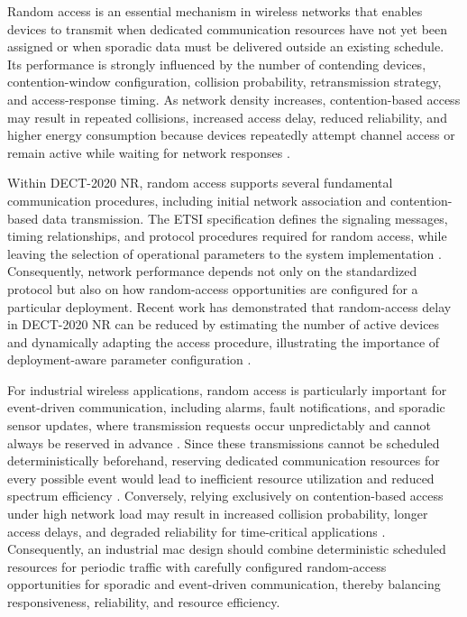 \documentclass[12pt,a4paper]{article}
\begin{document}
Random access is an essential mechanism in wireless networks that enables devices to transmit when dedicated communication resources have not yet been assigned or when sporadic data must be delivered outside an existing schedule. Its performance is strongly influenced by the number of contending devices, contention-window configuration, collision probability, retransmission strategy, and access-response timing. As network density increases, contention-based access may result in repeated collisions, increased access delay, reduced reliability, and higher energy consumption because devices repeatedly attempt channel access or remain active while waiting for network responses \cite{andrewsProvidingQualityService2001,fattahOverviewSchedulingAlgorithms2002a}.

Within DECT-2020 NR, random access supports several fundamental communication procedures, including initial network association and contention-based data transmission. The ETSI specification defines the signaling messages, timing relationships, and protocol procedures required for random access, while leaving the selection of operational parameters to the system implementation \cite{etsi_ts103636_4}. Consequently, network performance depends not only on the standardized protocol but also on how random-access opportunities are configured for a particular deployment. Recent work has demonstrated that random-access delay in DECT-2020 NR can be reduced by estimating the number of active devices and dynamically adapting the access procedure, illustrating the importance of deployment-aware parameter configuration \cite{gaidamakaOptimizingDelaysRandom2025}.

For industrial wireless applications, random access is particularly important for event-driven communication, including alarms, fault notifications, and sporadic sensor updates, where transmission requests occur unpredictably and cannot always be reserved in advance \cite{willigWirelessTechnologyIndustrial2005,vitturiIndustrialWirelessNetworks2013,wollschlaegerFutureIndustrialCommunication2017a}. Since these transmissions cannot be scheduled deterministically beforehand, reserving dedicated communication resources for every possible event would lead to inefficient resource utilization and reduced spectrum efficiency \cite{andrewsProvidingQualityService2001}. Conversely, relying exclusively on contention-based access under high network load may result in increased collision probability, longer access delays, and degraded reliability for time-critical applications \cite{fattahOverviewSchedulingAlgorithms2002a,gaidamakaOptimizingDelaysRandom2025}. Consequently, an industrial \gls{mac} design should combine deterministic scheduled resources for periodic traffic with carefully configured random-access opportunities for sporadic and event-driven communication, thereby balancing responsiveness, reliability, and resource efficiency.
\end{document}
